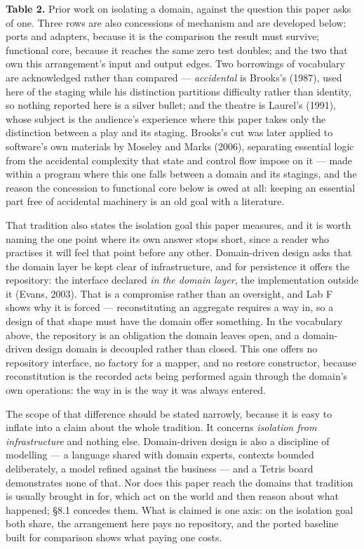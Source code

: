 \documentclass[
]{article}
\newcounter{none} %
\begin{document}
\textbf{Table 2.} Prior work on isolating a domain, against the question
this paper asks of one. Three rows are also concessions of mechanism and
are developed below: ports and adapters, because it is the comparison
the result must survive; functional core, because it reaches the same
zero test doubles; and the two that own this arrangement's input and
output edges. Two borrowings of vocabulary are acknowledged rather than
compared --- \emph{accidental} is Brooks's (1987), used here of the
staging while his distinction partitions difficulty rather than
identity, so nothing reported here is a silver bullet; and the theatre
is Laurel's (1991), whose subject is the audience's experience where
this paper takes only the distinction between a play and its staging.
Brooks's cut was later applied to software's own materials by Moseley
and Marks (2006), separating essential logic from the accidental
complexity that state and control flow impose on it --- made within a
program where this one falls between a domain and its stagings, and the
reason the concession to functional core below is owed at all: keeping
an essential part free of accidental machinery is an old goal with a
literature.

That tradition also states the isolation goal this paper measures, and
it is worth naming the one point where its own answer stops short, since
a reader who practises it will feel that point before any other.
Domain-driven design asks that the domain layer be kept clear of
infrastructure, and for persistence it offers the repository: the
interface declared \emph{in the domain layer}, the implementation
outside it (Evans, 2003). That is a compromise rather than an oversight,
and Lab F shows why it is forced --- reconstituting an aggregate
requires a way in, so a design of that shape must have the domain offer
something. In the vocabulary above, the repository is an obligation the
domain leaves open, and a domain-driven design domain is decoupled
rather than closed. This one offers no repository interface, no factory
for a mapper, and no restore constructor, because reconstitution is the
recorded acts being performed again through the domain's own operations:
the way in is the way it was always entered.

The scope of that difference should be stated narrowly, because it is
easy to inflate into a claim about the whole tradition. It concerns
\emph{isolation from infrastructure} and nothing else. Domain-driven
design is also a discipline of modelling --- a language shared with
domain experts, contexts bounded deliberately, a model refined against
the business --- and a Tetris board demonstrates none of that. Nor does
this paper reach the domains that tradition is usually brought in for,
which act on the world and then reason about what happened; §8.1
concedes them. What is claimed is one axis: on the isolation goal both
share, the arrangement here pays no repository, and the ported baseline
built for comparison shows what paying one costs.
\end{document}
